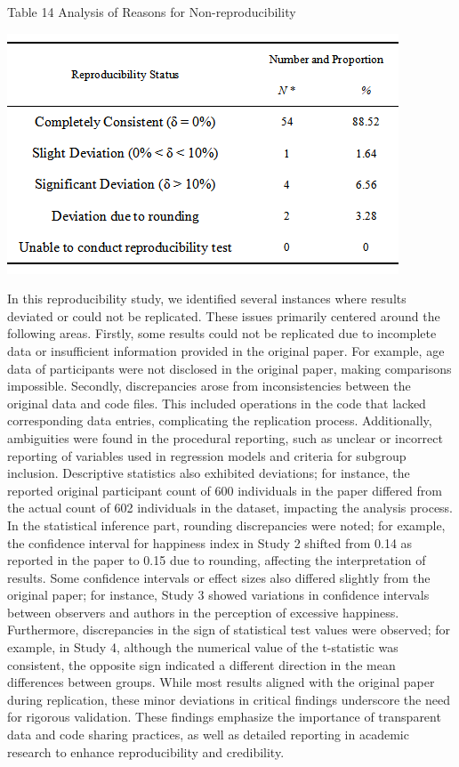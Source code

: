 \documentclass[
  man]{apa6}
\begin{document}
\begin{center}
Table 14 Analysis of Reasons for Non-reproducibility
\end{center}
\begin{center}
\includegraphics{reproducibility.png}
\end{center}

In this reproducibility study, we identified several instances where results deviated or could not be replicated. These issues primarily centered around the following areas. Firstly, some results could not be replicated due to incomplete data or insufficient information provided in the original paper. For example, age data of participants were not disclosed in the original paper, making comparisons impossible. Secondly, discrepancies arose from inconsistencies between the original data and code files. This included operations in the code that lacked corresponding data entries, complicating the replication process. Additionally, ambiguities were found in the procedural reporting, such as unclear or incorrect reporting of variables used in regression models and criteria for subgroup inclusion. Descriptive statistics also exhibited deviations; for instance, the reported original participant count of 600 individuals in the paper differed from the actual count of 602 individuals in the dataset, impacting the analysis process. In the statistical inference part, rounding discrepancies were noted; for example, the confidence interval for happiness index in Study 2 shifted from 0.14 as reported in the paper to 0.15 due to rounding, affecting the interpretation of results. Some confidence intervals or effect sizes also differed slightly from the original paper; for instance, Study 3 showed variations in confidence intervals between observers and authors in the perception of excessive happiness.
Furthermore, discrepancies in the sign of statistical test values were observed; for example, in Study 4, although the numerical value of the t-statistic was consistent, the opposite sign indicated a different direction in the mean differences between groups.
While most results aligned with the original paper during replication, these minor deviations in critical findings underscore the need for rigorous validation. These findings emphasize the importance of transparent data and code sharing practices, as well as detailed reporting in academic research to enhance reproducibility and credibility.
\end{document}
